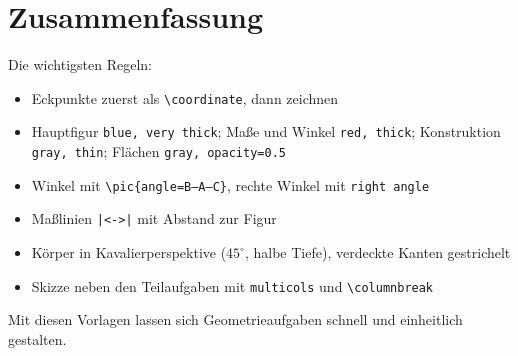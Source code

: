 \section{Zusammenfassung}

Die wichtigsten Regeln:

\begin{itemize}
	\item Eckpunkte zuerst als \texttt{\textbackslash coordinate}, dann zeichnen
	\item Hauptfigur \texttt{blue, very thick}; Maße und Winkel \texttt{red, thick}; Konstruktion \texttt{gray, thin}; Flächen \texttt{gray, opacity=0.5}
	\item Winkel mit \texttt{\textbackslash pic\{angle=B--A--C\}}, rechte Winkel mit \texttt{right angle}
	\item Maßlinien \texttt{|<->|} mit Abstand zur Figur
	\item Körper in Kavalierperspektive ($45^\circ$, halbe Tiefe), verdeckte Kanten gestrichelt
	\item Skizze neben den Teilaufgaben mit \texttt{multicols} und \texttt{\textbackslash columnbreak}
\end{itemize}

Mit diesen Vorlagen lassen sich Geometrieaufgaben schnell und einheitlich gestalten.


